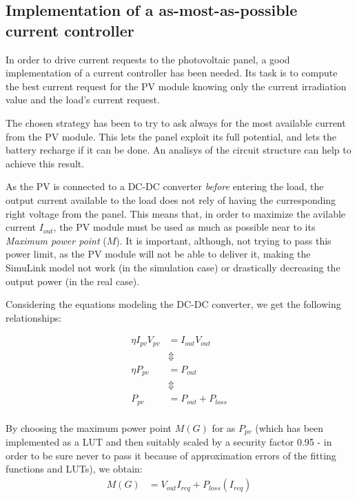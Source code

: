 \subsection{Implementation of a as-most-as-possible current controller}
In order to drive current requests to the photovoltaic panel, a good implementation of a current controller has been needed. Its task is to compute the best current request for the PV module knowing only the current irradiation value and the load's current request.

The chosen strategy has been to try to ask always for the most available current from the PV module. This lets the panel exploit its full potential, and lets the battery recharge if it can be done. An analisys of the circuit structure can help to achieve this result.

As the PV is connected to a DC-DC converter \emph{before} entering the load, the output current available to the load does not rely of having the curresponding right voltage from the panel. This means that, in order to maximize the avilable current $I_{out}$, the PV module must be used as much as possible near to its \emph{Maximum power point} ($M$). It is important, although, not trying to pass this power limit, as the PV module will not be able to deliver it, making the SimuLink model not work (in the simulation case) or drastically decreasing the output power (in the real case).

Considering the equations modeling the DC-DC converter, we get the following relationships:

\begin{align*}
  \eta I_{pv}V_{pv} &= I_{out}V_{out} \\
                    &\Updownarrow \\
  \eta P_{pv} &= P_{out} \\
                    &\Updownarrow \\
  P_{pv}&=P_{out}+P_{loss}  \\
\end{align*}

By choosing the maximum power point $M(G)$ for as $P_{pv}$ (which has been implemented as a LUT and then suitably scaled by a security factor 0.95 - in order to be sure never to pass it because of approximation errors of the fitting functions and LUTs), we obtain:
\begin{align*}
  M(G)&=V_{out}I_{req}+P_{loss}(I_{req}) \\
\end{align*}

